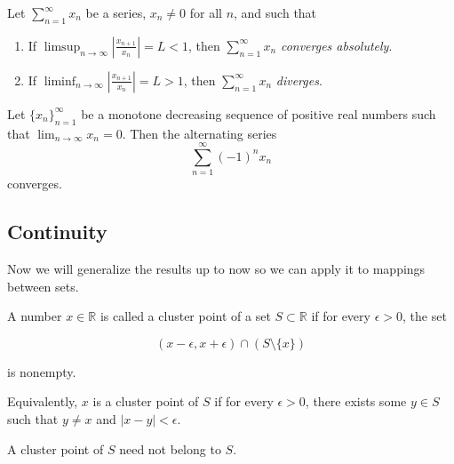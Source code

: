 \documentclass[../main.tex]{subfiles}
\begin{document}
    
    
    
    
    
    
    \begin{proposition}\label{prp:ratio_test_Series}
    Let $\sum_{n=1}^{\infty} x_n$ be a series, $x_n \neq 0$ for all $n$, and such that
    \begin{enumerate}
        \item If $\limsup_{n \to \infty} \left| \frac{x_{n+1}}{x_n} \right|  = L < 1$, then $\sum_{n=1}^{\infty} x_n$ \textit{converges absolutely}.
        \item If $\liminf_{n \to \infty} \left| \frac{x_{n+1}}{x_n} \right|  = L > 1$, then $\sum_{n=1}^{\infty} x_n$ \textit{diverges}.
    \end{enumerate}
    \end{proposition}
    
    
    
    
    
    
    \begin{proposition}\label{prp:alt_series_test}
    Let \( \{x_n\}_{n=1}^\infty \) be a monotone decreasing sequence of positive real numbers such that \(\lim_{n \to \infty} x_n = 0\). Then the alternating series
    \[
    \sum_{n=1}^\infty (-1)^n x_n
    \]
    converges.
    \end{proposition}
    
    
    
    
    \subsection{Continuity}
    
    \begin{remark}
    Now we will generalize the results up to now so we can apply it to mappings between sets. 
    \end{remark}
    
    
    
    
    
    
    
    
    \begin{definition}\label{def:cluster_point}
    A number \( x \in \mathbb{R} \) is called a cluster point of a set \( S \subset \mathbb{R} \) if for every \( \epsilon > 0 \), the set  
    
    \[
    (x - \epsilon, x + \epsilon) \cap (S \setminus \{x\})
    \]
    
    is nonempty.  
    
    Equivalently, \( x \) is a cluster point of \( S \) if for every \( \epsilon > 0 \), there exists some \( y \in S \) such that \( y \neq x \) and \( |x - y| < \epsilon \).  
    
    A cluster point of \( S \) need not belong to \( S \).
    \end{definition}
    
\end{document}
